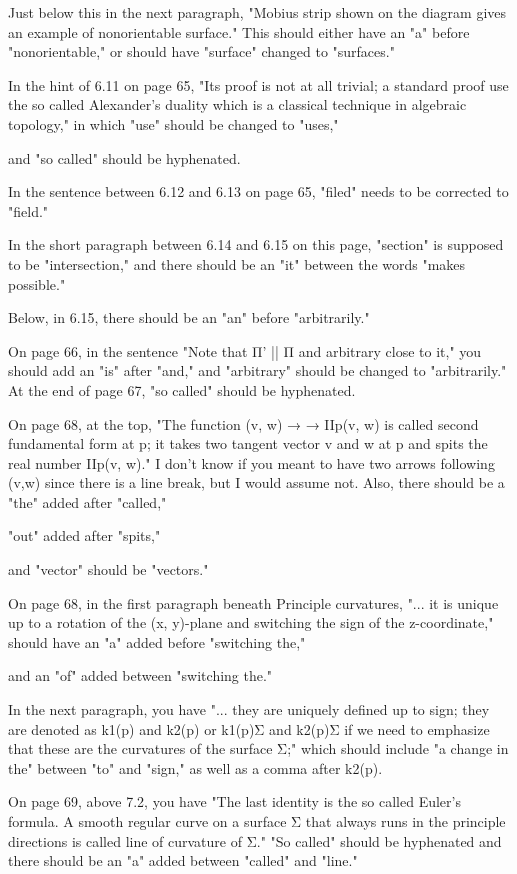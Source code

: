  Just below this in the next paragraph, "Mobius strip shown on the diagram gives an example of nonorientable surface." This should either have an "a" before "nonorientable," or should have "surface" changed to "surfaces." 
 
 In the hint of 6.11 on page 65, "Its proof is not at all trivial; a standard proof use the so called Alexander’s duality which is a classical technique in algebraic topology," in which "use" should be changed to "uses," 
 
 and "so called" should be hyphenated. 
 
 In the sentence between 6.12 and 6.13 on page 65, "filed" needs to be corrected to "field." 
 
 In the short paragraph between 6.14 and 6.15 on this page, "section" is supposed to be "intersection," and there should be an "it" between the words "makes possible." 
 
 Below, in 6.15, there should be an "an" before "arbitrarily." 
 
 On page 66, in the sentence "Note that Π' || Π and arbitrary close to it," you should add an "is" after "and," and "arbitrary" should be changed to "arbitrarily." At the end of page 67, "so called" should be hyphenated. 
 
 On page 68, at the top, "The function (v, w) → → IIp(v, w) is called second fundamental form at p; it takes two tangent vector v and w at p and spits the real number IIp(v, w)." I don't know if you meant to have two arrows following (v,w) since there is a line break, but I would assume not. Also, there should be a "the" added after "called," 
 
 "out" added after "spits," 
 
 and "vector" should be "vectors." 
 
 On page 68, in the first paragraph beneath Principle curvatures, "... it is unique up to a rotation of the (x, y)-plane and switching the sign of the z-coordinate," should have an "a" added before "switching the," 
 
 and an "of" added between "switching the." 
 
 In the next paragraph, you have "... they are uniquely defined up to sign; they are denoted as k1(p) and k2(p) or k1(p)Σ and k2(p)Σ if we need to emphasize that these are the curvatures of the surface Σ;" which should include "a change in the" between "to" and "sign," as well as a comma after k2(p). 
 
 On page 69, above 7.2, you have "The last identity is the so called Euler’s formula. A smooth regular curve on a surface Σ that always runs in the principle directions is called line of curvature of Σ." "So called" should be hyphenated and there should be an "a" added between "called" and "line." 
 
